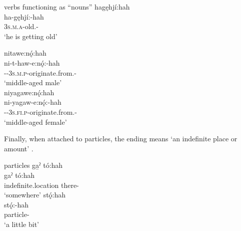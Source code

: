 \ea\label{ex:hahex3} verbs functioning as “nouns”
\ea hagęhjí:hah\\
\gll ha-gęhjí:-hah\\
\textsc{3s.m.a}-old.{\stative}-{\diminutive}\\
\glt ‘he is getting old’ 

\ex nitawe:nǫ́:hah\\
\gll ni-t-haw-e:nǫ́:-hah\\
{\partitive}-{\cislocative}-\textsc{3s.m.p}-originate.from.{\habitual}-{\diminutive}\\
\glt ‘middle-aged male’\\

\ex niyagawe:nǫ́:hah\\
\gll ni-yagaw-e:nǫ́:-hah\\
{\partitive}-{\cislocative}-\textsc{3s.fi.p}-originate.from.{\habitual}-{\diminutive}\\
\glt ‘middle-aged female’
\z
\z

Finally, when attached to particles, the  ending means `an indefinite place or amount' .

\newpage
\ea\label{ex:hahex4} particles
\ea ga̱ˀ tó:hah\\
\gll gaˀ tó:hah\\
 indefinite.location there-{\diminutive}\\
\glt `somewhere'
\ex stǫ́:hah\\
\gll stǫ́:-hah\\
 particle-{\diminutive}\footnotemark{}\\
\glt `a little bit'
\z
\z

